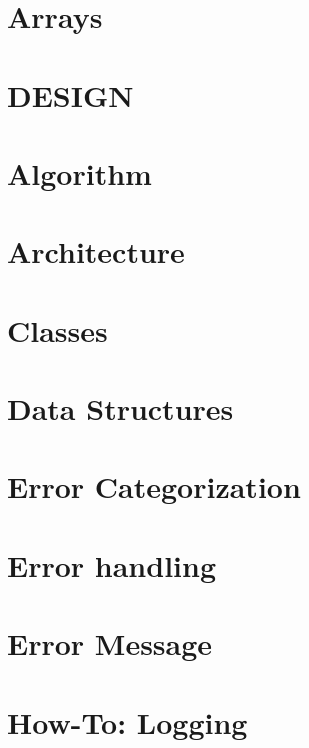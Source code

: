 \documentclass[twoside]{book}
\newcommand{\+}{\discretionary{\mbox{\scriptsize$\hookleftarrow$}}{}{}}
\begin{document}
\chapter{Arrays}
\label{doc_decisions_warning_array_md}

\chapter{D\+E\+S\+I\+GN}
\label{doc_DESIGN_md}

\chapter{Algorithm}
\label{doc_dev_algorithm_md}

\chapter{Architecture}
\label{doc_dev_architecture_md}

\chapter{Classes}
\label{doc_dev_classes_md}

\chapter{Data Structures}
\label{doc_dev_data-structures_md}

\chapter{Error Categorization}
\label{doc_dev_error-categorization_md}

\chapter{Error handling}
\label{doc_dev_error-handling_md}

\chapter{Error Message}
\label{doc_dev_error-message_md}

\chapter{How-\/\+To\+: Logging}
\label{doc_dev_logging_md}

\end{document}
